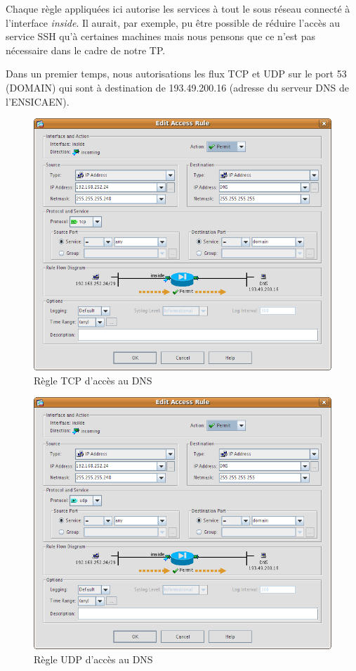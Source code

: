 \documentclass[a4paper,12pt]{article}
\begin{document}
Chaque règle appliquées ici autorise les services à tout le sous réseau connecté à l'interface \textit{inside}. Il aurait, par exemple, pu être possible de
réduire l'accès au service SSH qu'à certaines machines mais nous pensons que ce n'est pas nécessaire dans le cadre de notre TP.

Dans un premier temps, nous autorisations les flux TCP et UDP sur le port 53 (DOMAIN) qui sont à destination de 193.49.200.16 (adresse du serveur DNS de
l'ENSICAEN).

\begin{figure}[H]
	\center
	\includegraphics[width=13cm]{img/4-policyinsidednstcp.png}
	\caption{Règle TCP d'accès au DNS}
\end{figure}
\begin{figure}[H]
	\center
	\includegraphics[width=13cm]{img/5-policyinsidednsudp.png}
	\caption{Règle UDP d'accès au DNS}
\end{figure}
\end{document}
